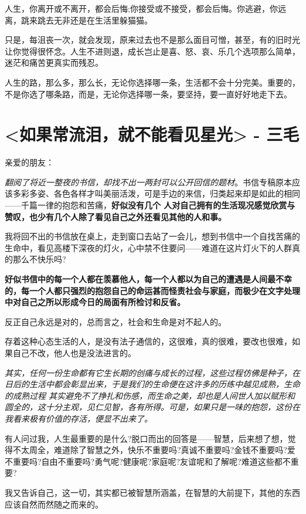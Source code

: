 \documentclass[UTF8,a4paper,8pt]{ctexart}
\begin{document}
 人生，你离开或不离开，都会后悔;你接受或不接受，都会后悔。你逃避，你远离，跳来跳去无非还是在生活里躲猫猫。
 
 只是，每沮丧一次，就会发现，原来过去也不是那么面目可憎，甚至，有的旧时光让你觉得很怀念。人生不进则退，成长岂止是喜、怒、哀、乐几个选项那么简单，迷茫和痛苦更真实而残忍。
 
 人生的路，那么多，那么长，无论你选择哪一条，生活都不会十分完美。重要的，不是你选了哪条路，而是，无论你选择哪一条，要坚持，要一直好好地走下去。
 
 
 \newpage
 \section{<如果常流泪，就不能看见星光> - 三毛}
 
 亲爱的朋友：
 
 \textit{翻阅了将近一整夜的书信，却找不出一两封可以公开回信的题材}。书信专稿原本应该多彩多姿、各色各样才叫美丽活泼，可是手边的来信，归类起来却是如此的相同——千篇一律的抱怨和苦痛，\textbf{好似没有几个 人对自己拥有的生活现况感觉欣赏与赞叹，也少有几个人除了看见自己之外还看见其他的人和事。}
 
 我将回不出的书信放在桌上，走到窗口去站了一会儿，想到书信中一个自找苦痛的生命中，看见高楼下深夜的灯火，心中禁不住要问——难道在这片灯火下的人群真的那么不快乐吗?
 
 \textbf{好似书信中的每一个人都在羡慕他人，每一个人都以为自己的遭遇是人间最不幸的，每一个人都只强烈的抱怨自己的命运甚而怪责社会与家庭，而极少在文字处理中对自己之所以形成今日的局面有所检讨和反省。}
 
 反正自己永远是对的，总而言之，社会和生命是对不起人的。
 
 存着这种心态生活的人，是没有法子通信的，这很难，真的很难，要改也很难，如果自己不改，他人也是没法进言的。
 
 \textit{其实，任何一份生命都有它生长期的创痛与成长的过程，这些过程仿佛是种子，在日后的生活中都会彰显出来，于是我们的生命便在这许多的历练中越见成熟，生命的成熟过程 其实避免不了挣扎和伤感，而生命之美，却也是人间世人加以赋形和圆全的，这十分主观，见仁见智，各有所得。可是，如果只是一味的抱怨，这份在我看来极有价值的存活，便显不出来了。}
 
 有人问过我，人生最重要的是什么?脱口而出的回答是——智慧，后来想了想，觉得不太周全，难道除了智慧之外，快乐不重要吗?真诚不重要吗?金钱不重要吗?爱不重要吗?自由不重要吗?勇气呢?健康呢?家庭呢?友谊呢和了解呢?难道这些都不重要?
 
 我又告诉自己，这一切，其实都已被智慧所涵盖，在智慧的大前提下，其他的东西应该自然而然随之而来的。
 
\end{document}
